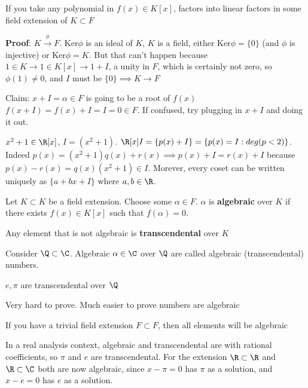 \documentclass[10pt]{article}
\begin{document}
\begin{cor}
    If you take any polynomial in $f(x) \in K[x]$, factors into linear factors in some field extension of $K \subset F$
\end{cor}

\textbf{Proof}: $K \stackrel{\phi}{\to} F$. Ker$\phi$ is an ideal of $K$, $K$ is a field, either Ker$\phi = \{0\}$ (and $\phi$ is injective) or Ker$\phi = K$. But that can't happen because $1 \in K \to 1 \in K[x] \to 1 + I$, a unity in $F$, which is certainly not zero, so $\phi(1) \neq 0$, and $I$ must be $\{0\} \implies K \to F$

Claim: $x + I = \alpha \in F$ is going to be a root of $f(x)$ $f(x + I) = f(x) + I = I = 0 \in F$. If confused, try plugging in $x + I$ and doing it out.

$x^2 + 1 \in \R[x]$, $I = (x^2 + 1)$. $\R[x]I = \{p(x) + I\} = \{p(x) = I : deg(p < 2)\}$. Indeed $p(x) = (x^2 + 1)q(x) + r(x) \implies p(x) + I = r(x) + I$ because $p(x) - r(x) = q(x)(x^2 + 1) \in I$. Morever, every coset can be written uniquely as $\{a + bx + I\}$ where $a, b \in \R$. 

\begin{defn}
    Let $K \subset K$ be a field extension. Choose some $\alpha \in F$. $\alpha$ is \textbf{algebraic} over $K$ if there exists $f(x) \in K[x]$ such that $f(\alpha) = 0$.
\end{defn}

\begin{defn}
    Any element that is not algebraic is \textbf{transcendental} over $K$
\end{defn}

\begin{exm*}
    Consider $\Q \subset \C$. Algebraic $\alpha \in \C$ over $\Q$ are called algebraic (transcendental) numbers.
\end{exm*}

\begin{thm}
    $e, \pi$ are transcendental over $\Q$ 
\end{thm}
Very hard to prove. Much easier to prove numbers are algebraic

\begin{rmk}
    If you have a trivial field extension $F \subset F$, then all elements will be algebraic    
\end{rmk}
In a real analysis context, algebraic and transcendental are with rational coefficients, so $\pi$ and $e$ are transcendental. For the extension $\R \subset \R$ and $\R \subset \C$ both are now algebraic, since $x - \pi = 0$ has $\pi$ as a solution, and $x - e = 0$ has $e$ as a solution.
\end{document}
